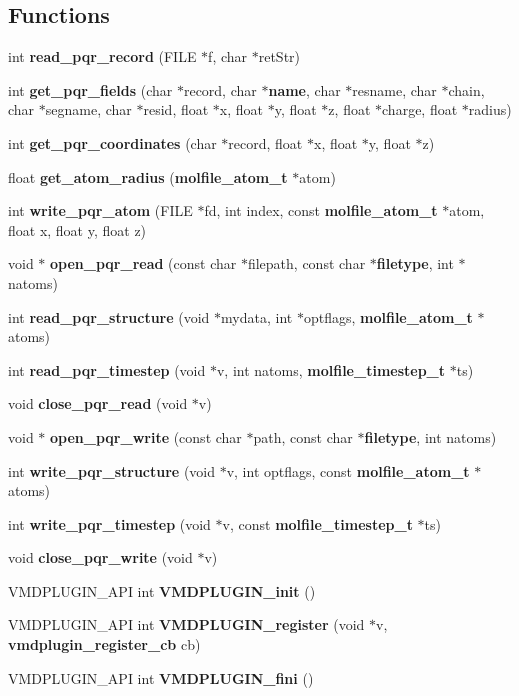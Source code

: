 \subsection*{Functions}
\begin{CompactItemize}
\item 
int {\bf read\_\-pqr\_\-record} (FILE $\ast$f, char $\ast$ret\-Str)
\item 
int {\bf get\_\-pqr\_\-fields} (char $\ast$record, char $\ast${\bf name}, char $\ast$resname, char $\ast$chain, char $\ast$segname, char $\ast$resid, float $\ast$x, float $\ast$y, float $\ast$z, float $\ast$charge, float $\ast$radius)
\item 
int {\bf get\_\-pqr\_\-coordinates} (char $\ast$record, float $\ast$x, float $\ast$y, float $\ast$z)
\item 
float {\bf get\_\-atom\_\-radius} ({\bf molfile\_\-atom\_\-t} $\ast$atom)
\item 
int {\bf write\_\-pqr\_\-atom} (FILE $\ast$fd, int index, const {\bf molfile\_\-atom\_\-t} $\ast$atom, float x, float y, float z)
\item 
void $\ast$ {\bf open\_\-pqr\_\-read} (const char $\ast$filepath, const char $\ast${\bf filetype}, int $\ast$natoms)
\item 
int {\bf read\_\-pqr\_\-structure} (void $\ast$mydata, int $\ast$optflags, {\bf molfile\_\-atom\_\-t} $\ast$atoms)
\item 
int {\bf read\_\-pqr\_\-timestep} (void $\ast$v, int natoms, {\bf molfile\_\-timestep\_\-t} $\ast$ts)
\item 
void {\bf close\_\-pqr\_\-read} (void $\ast$v)
\item 
void $\ast$ {\bf open\_\-pqr\_\-write} (const char $\ast$path, const char $\ast${\bf filetype}, int natoms)
\item 
int {\bf write\_\-pqr\_\-structure} (void $\ast$v, int optflags, const {\bf molfile\_\-atom\_\-t} $\ast$atoms)
\item 
int {\bf write\_\-pqr\_\-timestep} (void $\ast$v, const {\bf molfile\_\-timestep\_\-t} $\ast$ts)
\item 
void {\bf close\_\-pqr\_\-write} (void $\ast$v)
\item 
VMDPLUGIN\_\-API int {\bf VMDPLUGIN\_\-init} ()
\item 
VMDPLUGIN\_\-API int {\bf VMDPLUGIN\_\-register} (void $\ast$v, {\bf vmdplugin\_\-register\_\-cb} cb)
\item 
VMDPLUGIN\_\-API int {\bf VMDPLUGIN\_\-fini} ()
\end{CompactItemize}
